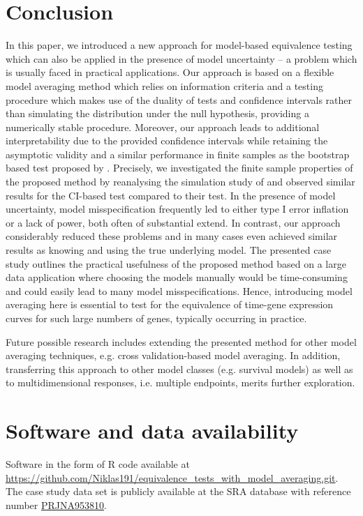{\section{Conclusion} 
\label{sec:conclusion}
In this paper, we introduced a new approach for
model-based equivalence testing which can also be applied in the presence of model uncertainty -- a problem which is usually faced in practical applications. 
Our approach is based on a flexible model averaging method which relies on information criteria and a testing procedure which makes use of the duality of tests and confidence intervals rather than simulating the distribution under the null hypothesis, providing a numerically stable procedure. 
Moreover, our approach leads to additional interpretability due to the provided confidence intervals while retaining the asymptotic validity and a similar performance in finite samples as the bootstrap based test proposed by \citet{Dette2018}. 
Precisely, we investigated the finite sample properties of the proposed method by reanalysing the simulation study of \citet{Dette2018} and observed similar results for the CI-based test compared to their test. 
In the presence of model uncertainty, model misspecification frequently led to either type I error inflation or a lack of power, both often of substantial extend. In contrast, our approach considerably reduced these problems and in many cases even achieved similar results as knowing and using the true underlying model. 
The presented case study outlines the practical usefulness of the proposed method based on a large data application where choosing the models manually would be time-consuming and could easily lead to many model misspecifications.  
Hence, introducing model averaging here is essential to test for the equivalence of time-gene expression curves for such large numbers of genes, typically occurring in practice.

Future possible research includes extending the presented method for other model averaging techniques, e.g. cross validation-based model averaging. In addition, transferring this approach to other model classes (e.g. survival models) as well as to multidimensional responses, i.e. multiple endpoints, merits further exploration.

\section*{Software and data availability}
Software in the form of R code  available at \url{https://github.com/Niklas191/equivalence_tests_with_model_averaging.git}.
The case study data set is publicly available at the SRA database with reference number \hyperlink{https://www.ncbi.nlm.nih.gov/sra/PRJNA953810}{PRJNA953810}.

}
